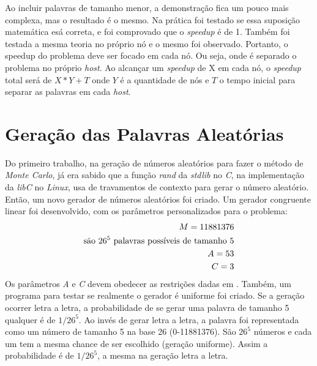\documentclass[a4paper]{article}
\begin{document}
\indent Ao incluir palavras de tamanho menor, a demonstração fica um pouco mais complexa, mas o resultado é o mesmo. Na prática foi testado se essa suposição matemática esá correta, e foi comprovado que o \emph{speedup} é de 1. Também foi testada a mesma teoria no próprio nó e o mesmo foi observado. Portanto, o speedup do problema deve ser focado em cada nó. Ou seja, onde é separado o problema no próprio \emph{host}. Ao alcançar um \emph{speedup} de X em cada nó, o \emph{speedup} total será de \begin{math}X*Y + T\end{math} onde \begin{math}Y\end{math} é a quantidade de nós e \begin{math}T\end{math} o tempo inicial para separar as palavras em cada \emph{host}.

\section{Geração das Palavras Aleatórias}
\indent \indent Do primeiro trabalho, na geração de números aleatórios para fazer o método de \emph{Monte Carlo}, já era sabido que a função \emph{rand} da \emph{stdlib} no \emph{C}, na implementação da \emph{libC} no \emph{Linux}, usa de travamentos de contexto para gerar o número aleatório. Então, um novo gerador de números aleatórios foi criado. Um gerador congruente linear foi desenvolvido, com os parâmetros personalizados para o problema:
\begin{eqnarray*}
	M = 11881376 \\\textrm{são \begin{math}26^5\end{math} palavras possíveis de tamanho 5}\\
	A = 53\\
	C = 3\\
\end{eqnarray*}	
\indent Os parâmetros \emph{A} e \emph{C} devem obedecer as restrições dadas em \cite{random2}. Também, um programa para testar se realmente o gerador é uniforme foi criado. Se a geração ocorrer letra a letra, a probabilidade de se gerar uma palavra de tamanho 5 qualquer é de \begin{math}1/26^5\end{math}. Ao invés de gerar letra a letra, a palavra foi representada como um número de tamanho 5 na base 26 (0-11881376). São \begin{math}26^5\end{math} números e cada um tem a mesma chance de ser escolhido (geração uniforme). Assim a probabilidade é de \begin{math}1/26^5\end{math}, a mesma na geração letra a letra.
\end{document}
